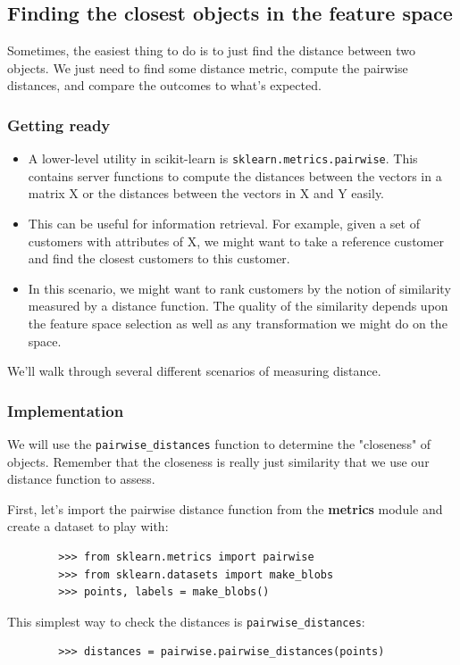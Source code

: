 \documentclass[SKL-MASTER.tex]{subfiles}
\begin{document}
\Large
	\subsection*{Finding the closest objects in the feature space}
	Sometimes, the easiest thing to do is to just find the distance between two objects. We just need
	to find some distance metric, compute the pairwise distances, and compare the outcomes to
	what's expected.
	\subsubsection*{Getting ready}
	\begin{itemize}
	\item A lower-level utility in scikit-learn is \texttt{sklearn.metrics.pairwise}. This contains server
	functions to compute the distances between the vectors in a matrix X or the distances
	between the vectors in X and Y easily.
	
	\item This can be useful for information retrieval. For example, given a set of customers with
	attributes of X, we might want to take a reference customer and find the closest customers to
	this customer. 
	\item In this scenario, we might want to rank customers by the notion of similarity measured
	by a distance function. The quality of the similarity depends upon the feature space selection
	as well as any transformation we might do on the space.\\ 
	\end{itemize}

	
\noindent	We'll walk through several different scenarios of measuring distance.
	\subsubsection*{Implementation}
	We will use the \texttt{pairwise\_distances} function to determine the "closeness" of objects.
	Remember that the closeness is really just similarity that we use our distance function
	to assess.
	
	First, let's import the pairwise distance function from the \textbf{metrics} module and create a
	dataset to play with:
	
	\begin{framed}
		\begin{verbatim}
		>>> from sklearn.metrics import pairwise
		>>> from sklearn.datasets import make_blobs
		>>> points, labels = make_blobs()
		\end{verbatim}
	\end{framed}
	This simplest way to check the distances is \texttt{pairwise\_distances}:
	\begin{framed}
		\begin{verbatim}
		>>> distances = pairwise.pairwise_distances(points)
		\end{verbatim}
	\end{framed}
	
\end{document}
